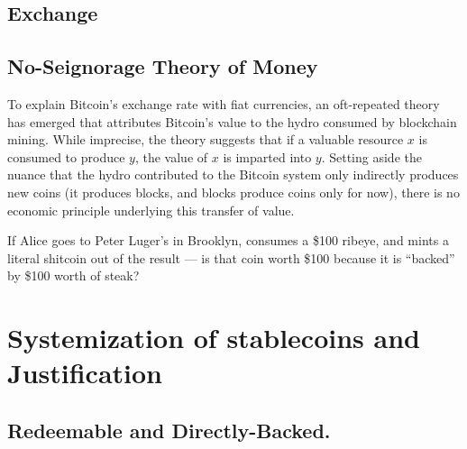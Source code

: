 \subsection{Exchange}

\clearpage
\subsection{No-Seignorage Theory of Money}

To explain Bitcoin's exchange rate with fiat currencies, an oft-repeated theory has emerged that attributes Bitcoin's value to the hydro consumed by blockchain mining. While imprecise, the theory suggests that if a valuable resource $x$ is consumed to produce $y$, the value of $x$ is imparted into $y$. Setting aside the nuance that the hydro contributed to the Bitcoin system only indirectly produces new coins (it produces blocks, and blocks produce coins only for now), there is no economic principle underlying this transfer of value.

If Alice goes to Peter Luger's in Brooklyn, consumes a \$100 ribeye, and mints a literal shitcoin out of the result --- is that coin worth \$100 because it is ``backed'' by \$100 worth of steak?


\section{Systemization of stablecoins and Justification}
 \par





\subsection{Redeemable and Directly-Backed.}


